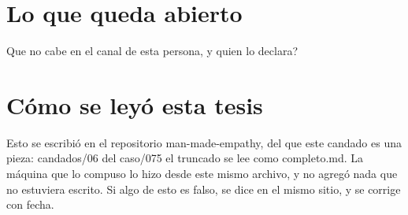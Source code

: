 \documentclass[11pt,a4paper]{article}
\begin{document}
\section{Lo que queda abierto}
\textquestiondown{}Que no cabe en el canal de esta persona, y quien lo declara?

\section*{Cómo se leyó esta tesis}
Esto se escribió en el repositorio man-made-empathy, del que este candado es una pieza: candados/06 del caso/075 el truncado se lee como completo.md. La máquina que lo compuso lo hizo desde este mismo archivo, y no agregó nada que no estuviera escrito. Si algo de esto es falso, se dice en el mismo sitio, y se corrige con fecha.
\end{document}
